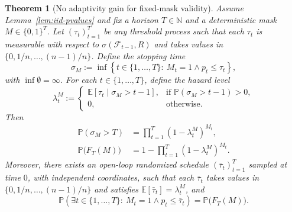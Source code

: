 \documentclass{uai2026} %
\newtheorem{theorem}{Theorem}[section]
\newcommand{\N}{\mathbb{N}}
\newcommand{\1}{\mathbf{1}}
\newcommand{\prob}{\mathbb{P}}
\newcommand{\expec}{\mathbb{E}}
\newcommand{\F}{\mathcal{F}}
\begin{document}
\begin{theorem}[No adaptivity gain for fixed-mask validity]
  \label{thm:no-adaptivity}
  Assume Lemma~\ref{lem:iid-pvalues} and fix a horizon $T\in\N$ and a deterministic mask $M\in\{0,1\}^{T}$.
  Let $(\tau_{t})_{t=1}^{T}$ be any threshold process such that each $\tau_{t}$ is measurable with respect to $\sigma(\F_{t-1},R)$ and takes values in $\{0,1/n,\dots,(n-1)/n\}$.
  Define the stopping time
  \begin{equation*}
    \sigma_{M} := \inf\left\{t\in\{1,\dots,T\}:\ M_{t}=1 \wedge p_{t}\le \tau_{t}\right\},
  \end{equation*}
  with $\inf\emptyset=\infty$.
  For each $t\in\{1,\dots,T\}$, define the hazard level
  \begin{equation*}
    \lambda_{t}^{M}
    :=
    \begin{cases}
      \expec[\tau_{t}\mid \sigma_{M}>t-1], & \text{if }\prob(\sigma_{M}>t-1)>0,\\
      0, & \text{otherwise.}
    \end{cases}
  \end{equation*}
  Then
  \begin{equation*}
    \begin{aligned}
      \prob(\sigma_{M}>T)
      &= \prod_{t=1}^{T}(1-\lambda_{t}^{M})^{M_{t}},\\
      \prob\bigl(F_{T}(M)\bigr)
      &= 1-\prod_{t=1}^{T}(1-\lambda_{t}^{M})^{M_{t}}.
    \end{aligned}
  \end{equation*}
  Moreover, there exists an open-loop randomized schedule $(\bar{\tau}_{t})_{t=1}^{T}$ sampled at time $0$, with independent coordinates, such that each $\bar{\tau}_{t}$ takes values in $\{0,1/n,\dots,(n-1)/n\}$ and satisfies $\expec[\bar{\tau}_{t}]=\lambda_{t}^{M}$, and
  \begin{equation*}
    \prob\left(\exists t\in\{1,\dots,T\}:\ M_{t}=1 \wedge p_{t}\le \bar{\tau}_{t}\right)
    =
    \prob\bigl(F_{T}(M)\bigr).
  \end{equation*}
\end{theorem}
\end{document}

